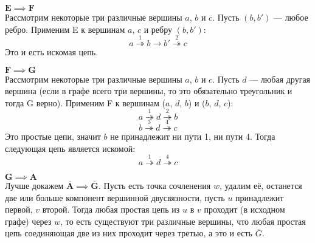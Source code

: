 \documentclass{article}
\newcommand{\mimplies}[2]{$\mathbf{#1 \implies #2}$}
\newcommand{\mto}[1]{\overset{#1}{\twoheadrightarrow}}
\newcommand{\mtoa}{\mto{1}}
\newcommand{\mtob}{\mto{2}}
\newcommand{\mtoc}{\mto{3}}
\newcommand{\mtod}{\mto{4}}
\begin{document}
\mimplies{E}{F}\\
Рассмотрим некоторые три различные вершины $a$, $b$ и $c$. Пусть $(b, b')$ --- любое ребро. Применим E к вершинам $a$, $c$ и ребру $(b, b')$:
$$a \mtoa b \to b' \mtob c$$
Это и есть искомая цепь.

\mimplies{F}{G}\\
Рассмотрим некоторые три различные вершины $a$, $b$ и $c$. Пусть $d$ --- любая другая вершина (если в графе всего три вершины, то это обязательно треугольник и тогда G верно). Применим F к вершинам ($a$, $d$, $b$) и ($b$, $d$, $c$):
$$a \mtoa d \mtob b$$
$$b \mtoc d \mtod c$$
Это простые цепи, значит $b$ не принадлежит ни пути 1, ни пути 4. Тогда следующая цепь является искомой:
$$a \mtoa d \mtod c$$

\mimplies{G}{A}\\
Лучше докажем \mimplies{\overline{A}}{\overline{G}}. 
Пусть есть точка сочленения $w$, удалим её, останется две или больше компонент вершинной двусвязности, пусть $u$ принадлежит первой, $v$ второй. Тогда любая простая цепь из $u$ в $v$ проходит (в исходном графе)  через $w$, то есть существуют три различные вершины, что любая простая цепь соединяющая две из них проходит через третью, а это и есть $\overline{G}$.
\end{document}
